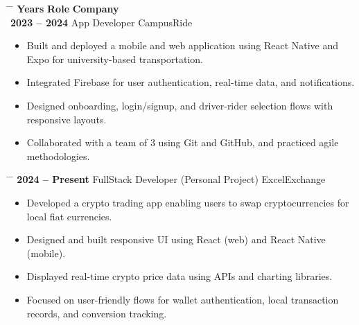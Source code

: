 \documentclass{article}
\newcommand{\sectiondivider}[2][0.4]{%
    \noindent
    \vspace{3pt}
    \textcolor{black}{%
        \noindent
        \makebox[\linewidth]{\rule{#1\linewidth}{0.5pt}%
        \hspace{5pt} \textbf{\uppercase{#2}} \hspace{5pt}%
        \rule{#1\linewidth}{0.5pt}}%
    }
    \vspace{3pt}
}
\begin{document}
\sectiondivider[0.38]{Work Experiences}
\noindent
\begin{tabbing}
    \hspace{5cm} \= \hspace{8cm} \= \kill 
    \textbf{Years} \> \textbf{Role}  \> \textbf{Company} \\[0.3cm]
    \textbf{2023 -- 2024} \> App Developer  \> CampusRide \\[0.1cm]
\end{tabbing}
\vspace{-0.3cm}
\begin{itemize}
    \item Built and deployed a mobile and web application using React Native and Expo for university-based transportation.
    \item Integrated Firebase for user authentication, real-time data, and notifications.
    \item Designed onboarding, login/signup, and driver-rider selection flows with responsive layouts.
    \item Collaborated with a team of 3 using Git and GitHub, and practiced agile methodologies.
\end{itemize}

\vspace{0.2cm}
\noindent
\begin{tabbing}
    \hspace{5cm} \= \hspace{8cm} \= \kill 
    \textbf{2024 -- Present} \> FullStack Developer (Personal Project)  \> ExcelExchange \\[0.1cm]
\end{tabbing}
\vspace{-0.3cm}
\begin{itemize}
    \item Developed a crypto trading app enabling users to swap cryptocurrencies for local fiat currencies.
    \item Designed and built responsive UI using React (web) and React Native (mobile).
    \item Displayed real-time crypto price data using APIs and charting libraries.
    \item Focused on user-friendly flows for wallet authentication, local transaction records, and conversion tracking.
\end{itemize}
\end{document}
